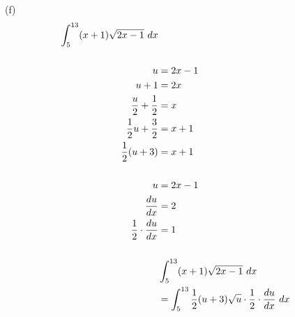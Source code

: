 \begin{exercise}
    (f)
    \begin{align}
        \int_5^{13} (x + 1)\sqrt{2x - 1} \ dx                                                                                                                                                \\
        \\
        u                               & = 2x - 1                                                                                                                                           \\
        u + 1                           & = 2x                                                                                                                                               \\
        {u \over 2} + {1 \over 2}       & = x                                                                                                                                                \\
        {1 \over 2}u + {3 \over 2}      & = x + 1                                                                                                                                            \\
        {1 \over 2}(u + 3)              & = x + 1                                                                                                                                            \\
        \\
        u                               & = 2x - 1                                                                                                                                           \\
        {du \over dx}                   & = 2                                                                                                                                                \\
        {1 \over 2} \cdot {du \over dx} & = 1                                                                                                                                                \\
        \\
                                        & \int_5^{13} (x + 1)\sqrt{2x - 1} \ dx                                                                                                              \\
                                        & = \int_5^{13} {1 \over 2}(u + 3)\sqrt{u} \cdot {1 \over 2} \cdot {du \over dx} \ dx                                                                \\

\end{align}
\end{exercise}
